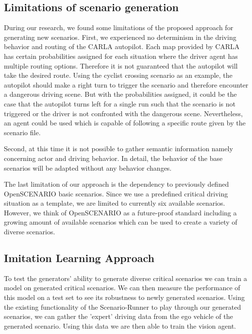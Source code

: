 \documentclass[conference, a4paper, 11pt]{IEEEtran}
\begin{document}
	\subsection{Limitations of scenario generation}
	During our research, we found some limitations of the proposed approach for generating new scenarios. First, we experienced no determinism in the driving behavior and routing of the CARLA autopilot. Each map provided by CARLA has certain probabilities assigned for each situation where the driver agent has multiple routing options. Therefore it is not guaranteed that the autopilot will take the desired route. Using the cyclist crossing scenario as an example, the autopilot should make a right turn to trigger the scenario and therefore encounter a dangerous driving scene. But with the probabilities assigned, it could be the case that the autopilot turns left for a single run such that the scenario is not triggered or the driver is not confronted with the dangerous scene. Nevertheless, an agent could be used which is capable of following a specific route given by the scenario file.
	
	Second, at this time it is not possible to gather semantic information namely concerning actor and driving behavior. In detail, the behavior of the base scenarios will be adapted without any behavior changes.  
	
	The last limitation of our approach is the dependency to previously defined OpenSCENARIO basic scenarios. Since we use a predefined critical driving situation as a template, we are limited to currently six available scenarios. However, we think of OpenSCENARIO as a future-proof standard including a growing amount of available scenarios which can be used to create a variety of diverse scenarios.
	
	\subsection{Imitation Learning Approach}
	To test the generators' ability to generate diverse critical scenarios we can train a model on generated critical scenarios. We can then measure the performance of this model on a test set to see its robustness to newly generated scenarios. Using the existing functionality of the Scenario-Runner to play through our generated scenarios, we can gather the 'expert' driving data from the ego vehicle of the generated scenario. Using this data we are then able to train the vision agent.
	
\end{document}
